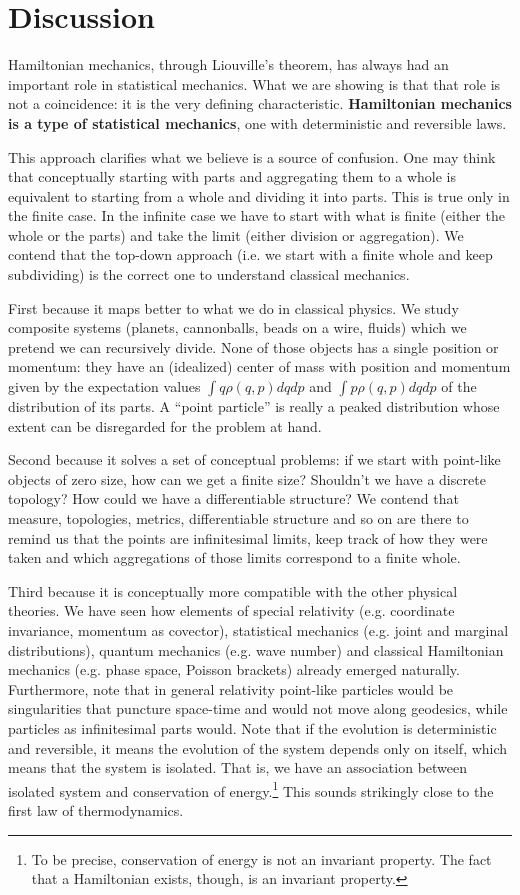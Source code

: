 \documentclass[11pt]{elsarticle}
\begin{document}
\section{Discussion}

Hamiltonian mechanics, through Liouville's theorem, has always had an important role in statistical mechanics. What we are showing is that that role is not a coincidence: it is the very defining characteristic. \textbf{Hamiltonian mechanics is a type of statistical mechanics}, one with deterministic and reversible laws.

This approach clarifies what we believe is a source of confusion. One may think that conceptually starting with parts and aggregating them to a whole is equivalent to starting from a whole and dividing it into parts. This is true only in the finite case. In the infinite case we have to start with what is finite (either the whole or the parts) and take the limit (either division or aggregation). We contend that the top-down approach (i.e. we start with a finite whole and keep subdividing) is the correct one to understand classical mechanics.

First because it maps better to what we do in classical physics. We study composite systems (planets, cannonballs, beads on a wire, fluids) which we pretend we can recursively divide. None of those objects has a single position or momentum: they have an (idealized) center of mass with position and momentum given by the expectation values $\int q \rho(q,p) dq dp$ and $\int p \rho(q,p) dq dp$ of the distribution of its parts. A ``point particle'' is really a peaked distribution whose extent can be disregarded for the problem at hand.

Second because it solves a set of conceptual problems: if we start with point-like objects of zero size, how can we get a finite size? Shouldn't we have a discrete topology? How could we have a differentiable structure? We contend that measure, topologies, metrics, differentiable structure and so on are there to remind us that the points are infinitesimal limits, keep track of how they were taken and which aggregations of those limits correspond to a finite whole.

Third because it is conceptually more compatible with the other physical theories. We have seen how elements of special relativity (e.g. coordinate invariance, momentum as covector), statistical mechanics (e.g. joint and marginal distributions), quantum mechanics (e.g. wave number) and classical Hamiltonian mechanics (e.g. phase space, Poisson brackets) already emerged naturally. Furthermore, note that in general relativity point-like particles would be singularities that puncture space-time and would not move along geodesics, while particles as infinitesimal parts would. Note that if the evolution is deterministic and reversible, it means the evolution of the system depends only on itself, which means that the system is isolated. That is, we have an association between isolated system and conservation of energy.\footnote{To be precise, conservation of energy is not an invariant property. The fact that a Hamiltonian exists, though, is an invariant property.} This sounds strikingly close to the first law of thermodynamics.
\end{document}

